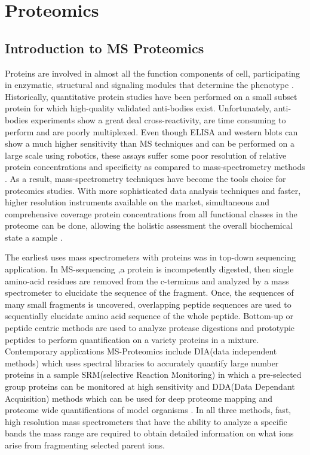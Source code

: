 \documentclass[a4paper,11pt,twoside]{book}
\begin{document}
	
	
	
	
	\chapter{Proteomics}
	
	\section{Introduction to MS Proteomics}
	Proteins are involved in almost all the function components of cell, participating in enzymatic, structural and signaling modules that determine the phenotype \citep{Hartwell1999FromBiology}. Historically, quantitative protein studies have been performed on a small subset protein for which high-quality validated anti-bodies exist. Unfortunately, anti-bodies experiments show a great deal cross-reactivity, are time consuming to perform and are poorly multiplexed\citep{Solier2014Antibody-basedLimitations}. Even though ELISA and western blots can show a much higher sensitivity than MS techniques and can be performed on a large scale using robotics, these assays suffer some poor resolution of relative protein concentrations and specificity as compared to mass-spectrometry methods \citep{Solier2014Antibody-basedLimitations}. As a result, mass-spectrometry techniques have become the tools choice for proteomics studies. With more sophisticated data analysis techniques and faster, higher resolution instruments available on the market, simultaneous and comprehensive coverage protein concentrations from all functional classes in the proteome can be done, allowing the holistic assessment the overall biochemical state a sample \citep{Schubert2017QuantitativeResearch}.
	
	The earliest uses mass spectrometers with proteins was in top-down sequencing application. In MS-sequencing ,a protein is incompetently digested, then single amino-acid residues are removed from the c-terminus and analyzed by a mass spectrometer to elucidate the sequence of the fragment. Once, the sequences of many small fragments is uncovered, overlapping peptide sequences are used to sequentially elucidate amino acid sequence of the whole peptide\citep{Steen2004TheSequencing}. Bottom-up or peptide centric methods are used to analyze protease digestions and prototypic peptides to perform quantification on a variety proteins in a mixture. Contemporary applications MS-Proteomics include DIA(data independent methods) which uses spectral libraries to accurately quantify large number proteins in a sample SRM(selective Reaction Monitoring) in which a pre-selected group proteins can be monitored at high sensitivity\citep{Picotti2012SelectedDirections} and DDA(Data Dependant Acquisition) methods which can be used for deep proteome mapping \citep{Nagaraj2011DeepLine.} and proteome wide quantifications of model organisms \citep{deGodoy2008ComprehensiveYeast}. In all three methods, fast, high resolution mass spectrometers that have the ability to analyze a specific bands the mass range are required to obtain detailed information on what ions arise from fragmenting selected parent ions.
	
\end{document}
